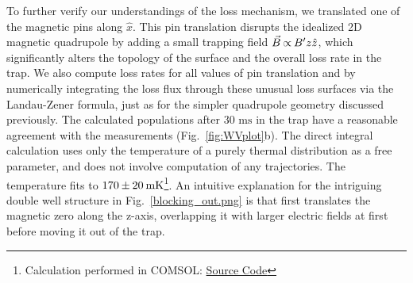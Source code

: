 \documentclass[defaultstyle,11pt]{thesis}
\begin{document}
To further verify our understandings of the loss mechanism, we translated one of the magnetic pins along $\hat{x}$.
This pin translation disrupts the idealized 2D magnetic quadrupole by adding a small trapping field $\vec{B} {\nobreak\hspace{.2em}} {\propto}{\nobreak\hspace{.2em}}  B^\prime z\hat{z}$, which significantly alters the topology of the \epb{} surface and the overall loss rate in the trap. We also compute loss rates for all values of pin translation and \bcl{} by numerically integrating the loss flux through these unusual loss surfaces via the Landau-Zener formula, just as for the simpler quadrupole geometry discussed previously.  The calculated populations after $30\text{ ms}$ in the trap have a reasonable agreement with the measurements (Fig.~\ref{fig:WVplot}b).
The direct integral calculation uses only the temperature of a purely thermal distribution as a free parameter, and does not involve computation of any trajectories.
The temperature fits to $170{\nobreak\hspace{.2em}} {\pm}{\nobreak\hspace{.2em}} 20{\nobreak\hspace{.2em}}\text{mK}$\s\footnote{Calculation performed in COMSOL: \href{https://github.com/dreens/spin-flip-integration/}{Source Code}}.
An intuitive explanation for the intriguing double well structure in Fig.~\ref{blocking_out.png} is that \bcl{} first translates the magnetic zero along the z-axis, overlapping it with larger electric fields at first before moving it out of the trap.

\end{document}
